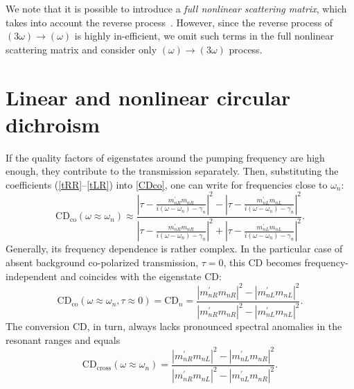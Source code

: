 \documentclass[
    reprint,
    superscriptaddress,
    a4paper,
    amsmath,amssymb,
    prb,
]{revtex4-2}
\begin{document}
We note that it is possible to introduce a \textit{full nonlinear scattering matrix}, which takes into account the reverse process~\cite{Achouri2018IEEE}. However, since the reverse process of $(3\omega)\to (\omega)$ is highly in-efficient, we omit such terms in the full nonlinear scattering matrix and consider only $(\omega) \to (3\omega)$ process.





\section{Linear and nonlinear circular dichroism}

If the quality factors of eigenstates around the pumping frequency are high enough, they contribute to the transmission separately. Then, substituting the coefficients (\ref{tRR}--\ref{tLR}) into \eqref{CDco}, one can write for frequencies close to $\omega_n$:
\begin{equation}
	\label{CDn}
	\mathrm{CD}_{\text{co}} (\omega \approx \omega_n) \approx \frac{|\tau- \frac{m^{\prime}_{nR}m_{nR}}{i(\omega-\omega_n)-\gamma_n}|^2 - |\tau- \frac{m^{\prime}_{nL}m_{nL}}{i(\omega-\omega_n)-\gamma_n}|^2}{|\tau- \frac{m^{\prime}_{nR}m_{nR}}{i(\omega-\omega_n)-\gamma_n}|^2 + |\tau- \frac{m^{\prime}_{nL}m_{nL}}{i(\omega-\omega_n)-\gamma_n}|^2}.
\end{equation}
Generally, its frequency dependence  is rather complex.  
In the particular case of absent background co-polarized transmission, $\tau=0$, this CD becomes frequency-independent and coincides with the eigenstate CD:
\begin{equation}
	\label{def_CD_n}
	\mathrm{CD}_{\text{co}} (\omega\approx\omega_n, \tau \approx 0) = 
	\mathrm{CD}_n = \frac{|m^{\prime}_{nR}m_{nR}|^2 - |m^{\prime}_{nL}m_{nL}|^2}{|m^{\prime}_{nR}m_{nR}|^2 - |m^{\prime}_{nL}m_{nL}|^2}.
\end{equation}
The conversion CD, in turn, always lacks pronounced spectral anomalies in the resonant ranges and  equals 
\begin{equation}
	\label{res_CD_cross}
	\mathrm{CD}_{\text{cross}} (\omega \approx \omega_n)= \frac{|m^{\prime}_{nR}m_{nL}|^2 - |m^{\prime}_{nL}m_{nR}|^2}{|m^{\prime}_{nR}m_{nL}|^2 - |m^{\prime}_{nL}m_{nR}|^2}.
\end{equation}
\end{document}
